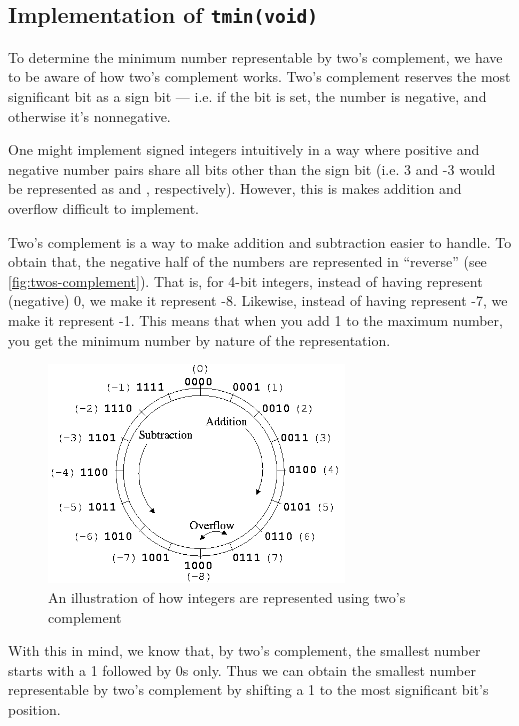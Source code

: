 \subsection{Implementation of \texttt{tmin(void)}}

To determine the minimum number representable by two's complement, we have to be aware of how two's complement works. Two's complement reserves the most significant bit as a sign bit --- i.e. if the bit is set, the number is negative, and otherwise it's nonnegative.

One might implement signed integers intuitively in a way where positive and negative number pairs share all bits other than the sign bit (i.e. 3 and -3 would be represented as  and , respectively). However, this is makes addition and overflow difficult to implement.

Two's complement is a way to make addition and subtraction easier to handle. To obtain that, the negative half of the numbers are represented in ``reverse'' (see \autoref{fig:twos-complement}). That is, for 4-bit integers, instead of having  represent (negative) 0, we make it represent -8. Likewise, instead of having  represent -7, we make it represent -1. This means that when you add 1 to the maximum number, you get the minimum number by nature of the representation.

\begin{figure}[H]
  \centering
  \includegraphics[width=0.7\textwidth]{figures/twos-complement.png}
  \caption[nothing]{An illustration of how integers are represented using two's complement\protect\footnotemark}
  \label{fig:twos-complement}
\end{figure}

With this in mind, we know that, by two's complement, the smallest number starts with a 1 followed by 0s only. Thus we can obtain the smallest number representable by two's complement by shifting a 1 to the most significant bit's position.


